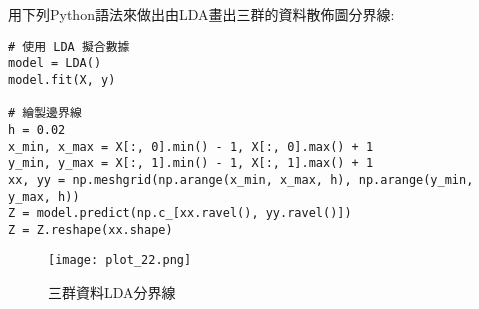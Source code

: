 \documentclass[12pt, a4paper]{article}
\begin{document}
\begin{enumerate}
用下列Python語法來做出由LDA畫出三群的資料散佈圖分界線\;:
\begin{lstlisting}
# 使用 LDA 擬合數據
model = LDA()
model.fit(X, y)

# 繪製邊界線
h = 0.02 
x_min, x_max = X[:, 0].min() - 1, X[:, 0].max() + 1
y_min, y_max = X[:, 1].min() - 1, X[:, 1].max() + 1
xx, yy = np.meshgrid(np.arange(x_min, x_max, h), np.arange(y_min, y_max, h))
Z = model.predict(np.c_[xx.ravel(), yy.ravel()])
Z = Z.reshape(xx.shape)
\end{lstlisting}

\begin{figure}[h]
\centering
\texttt{[image: plot\_22.png]}
\caption{三群資料LDA分界線}
\label{fig:plot_22.png}
\end{figure}
\end{enumerate}
\end{document}
